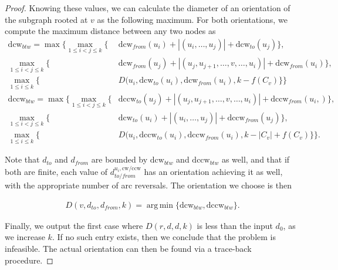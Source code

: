 \documentclass[11pt, twoside]{article}
\numberwithin{equation}{section}
\numberwithin{table}{section}
\numberwithin{figure}{section}
\theoremstyle{definition}
\theoremstyle{definition}
\theoremstyle{definition}
\DeclareMathOperator*{\argmin}{arg\,min}
\begin{document}
\begin{appendices}
\begin{proof}
	Knowing these values, we can calculate the diameter of an orientation of the subgraph rooted at $ v $ as the following maximum. For both orientations, we compute the maximum distance between any two nodes as
	\begin{align*}
		\text{dcw}_{btw} = \max \big\{ \max_{1\leq i<j\leq k}\{&\text{dcw}_{from}(u_i) + |(u_i,\ldots, u_j)| %
  + \text{dcw}_{to}(u_j)\}, \\
		\max_{1\leq i<j\leq k}\{&\text{dcw}_{from}(u_j) + |(u_j,u_{j+1},\ldots, v,\ldots, u_i)|
  + \text{dcw}_{from}(u_i)\},\\ 
		\max_{1\leq i\leq k}\{&D(u_i, \text{dcw}_{to}(u_i), \text{dcw}_{from}(u_i), k-f(C_v)\} \big\}\\
		\text{dccw}_{btw} = \max\big\{
		\max_{1\leq i<j\leq k}\{&\text{dccw}_{to}(u_j) + |(u_j,u_{j+1},\ldots, v,\ldots, u_i)|%
  + \text{dccw}_{from}(u_i, )\},\\
		\max_{1\leq i<j\leq k}\{&\text{dcw}_{to}(u_i) + |(u_i,\ldots, u_j)|%
  + \text{dccw}_{from}(u_j)\},\\
		\max_{1\leq i\leq k}\{&D(u_i, \text{dccw}_{to}(u_i), \text{dccw}_{from}(u_i), k-|C_v|+f(C_v)\} \big\}.
	\end{align*}

	Note that $ d_{to} $ and $ d_{from} $ are bounded by $ \text{dcw}_{btw}$ and $ \text{dccw}_{btw} $ as well, and that if both are finite, each value of $d_{to/from}^{u_i,\text{cw}/\text{ccw}}$ has an orientation achieving it as well, with the appropriate number of arc reversals.
	The orientation we choose is then
	
	\begin{align*}
		D(v, d_{to}, d_{from}, k) = \argmin\{\text{dcw}_{btw}, \text{dccw}_{btw}\}.
	\end{align*}

    Finally, we output the first case where $D(r, d, d, k)$ is less than the input $d_0$, as we increase $k$. If no such entry exists, then we conclude that the problem is infeasible. The actual orientation can then be found via a trace-back procedure.


\end{proof}
\end{appendices}
\end{document}
